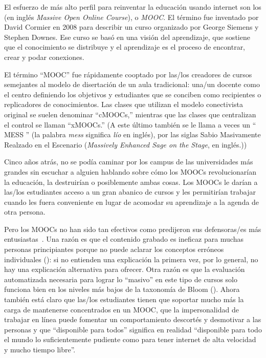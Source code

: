 
El esfuerzo de más alto perfil para reinventar la educación usando internet
son los  (en inglés \emph{Massive Open Online Course}), o \emph{MOOC}.
El término fue inventado por David Cormier en 2008
para describir un curso organizado por George Siemens
y Stephen Downes.
Ese curso se basó en una visión  del aprendizaje,
que sostiene que el conocimiento se distribuye
y el aprendizaje es el proceso de encontrar, crear y podar conexiones.

El término ``MOOC'' fue rápidamente cooptado por las/los creadores de
cursos semejantes al modelo de disertación de un aula tradicional:
una/un docente como el centro definiendo los objetivos
y estudiantes que se conciben como recipientes o replicadores de conocimientos.
Las clases que utilizan el modelo conectivista original se suelen denominar ``cMOOCs,''
mientras que las clases que centralizan el control se llaman ``xMOOCs.''
(A este último también se le llama a veces un `` MESS '' (la palabra \emph{mess} significa \emph{lío} en inglés),
por las siglas Sabio Masivamente Realzado en el Escenario (\emph{Massively Enhanced Sage on the Stage}, en inglés.))

Cinco años atrás,
no se podía caminar por los campus de las universidades más grandes
sin escuchar a alguien hablando sobre cómo los MOOCs revolucionarían la educación,
la destruirían
o posiblemente ambas cosas.
Los MOOCs le darían a las/los estudiantes acceso a un gran abanico de cursos
y les permitirían trabajar cuando les fuera conveniente
en lugar de acomodar su aprendizaje a la agenda de otra persona.

Pero los MOOCs no han sido tan efectivos
como predijeron sus defensoras/es más entusiastas~\cite{Ubel2017}.
Una razón es que
el contenido grabado es ineficaz para muchas personas principiantes
porque no puede aclarar los conceptos erróneos individuales ():
si no entienden una explicación la primera vez,
por lo general, no hay una explicación alternativa para ofrecer.
Otra razón es que la evaluación automatizada necesaria para lograr lo ``masivo'' en este tipo de cursos
solo funciona bien en los niveles más bajos de la taxonomía de Bloom ().
Ahora también está claro que
las/los estudiantes tienen que soportar mucho más la carga de mantenerse concentrados en un MOOC,
que la impersonalidad de trabajar en línea puede fomentar un comportamiento descortés y desmotivar a las personas
y que ``disponible para todos'' significa en realidad
``disponible para todo el mundo lo suficientemente pudiente como para tener internet de alta velocidad y mucho tiempo libre''.

